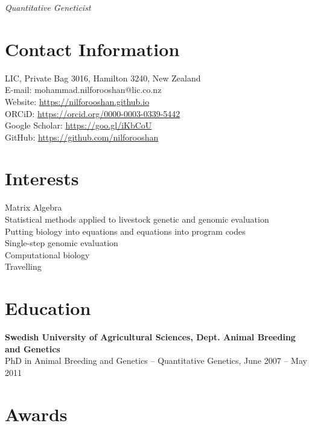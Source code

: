 \documentclass[margin,line]{res}
\begin{document}
 \hfill {\em Quantitative Geneticist}

\begin{resume}
  \section{\sc Contact Information}

  LIC, Private Bag 3016, Hamilton 3240, New Zealand \\
  {E-mail:}  mohammad.nilforooshan@lic.co.nz \\
  {Website:} \url{https://nilforooshan.github.io} \\
  {ORCiD:} \url{https://orcid.org/0000-0003-0339-5442} \\
  {Google Scholar:} \url{https://goo.gl/iKbCoU} \\
  {GitHub:}  \url{https://github.com/nilforooshan}
  \section{\sc Interests}

  Matrix Algebra \\
  Statistical methods applied to livestock genetic and genomic evaluation \\
  Putting biology into equations and equations into program codes \\
  Single-step genomic evaluation \\
  Computational biology \\
  Travelling
  \section{\sc Education}

  {\bf Swedish University of Agricultural Sciences, Dept. Animal Breeding and Genetics} \\
  PhD in Animal Breeding and Genetics -- Quantitative Genetics, June 2007 -- May 2011
  \section{\sc Awards}


\end{resume}
\end{document}
